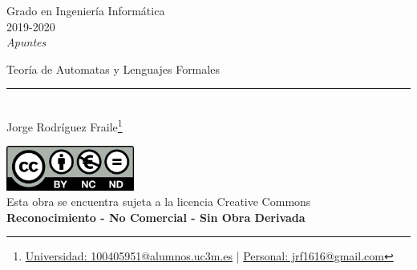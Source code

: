 \documentclass[12pt, twoside, openright]{report} %
\begin{document}
	
\begin{titlepage}
	\begin{sffamily}
	\color{azulUC3M}
	\begin{center}
		\begin{figure}[H] %
		\end{figure}
		\vspace{2.5cm}
		\begin{Large}
			Grado en Ingeniería Informática\\			
			2019-2020\\
			\vspace{2cm}		
			\textsl{Apuntes}\\
			\bigskip
		\end{Large}
		 	{\Huge Teoría de Automatas y Lenguajes Formales}\\
		 	\vspace*{0.5cm}
	 		\rule{10.5cm}{0.1mm}\\
			\vspace*{0.9cm}
			{\LARGE Jorge Rodríguez Fraile\footnote{\href{mailto:100405951@alumnos.uc3m.es}{Universidad: 100405951@alumnos.uc3m.es}  |  \href{mailto:jrf1616@gmail.com}{Personal: jrf1616@gmail.com}}}\\ 
			\vspace*{1cm}
	\end{center}
	\vfill
	\color{black}
		\includegraphics[width=4.2cm]{img/creativecommons.png}\\
		Esta obra se encuentra sujeta a la licencia Creative Commons\\ \textbf{Reconocimiento - No Comercial - Sin Obra Derivada}
	\end{sffamily}
\end{titlepage}


\tableofcontents
\thispagestyle{fancy}
\end{document}
